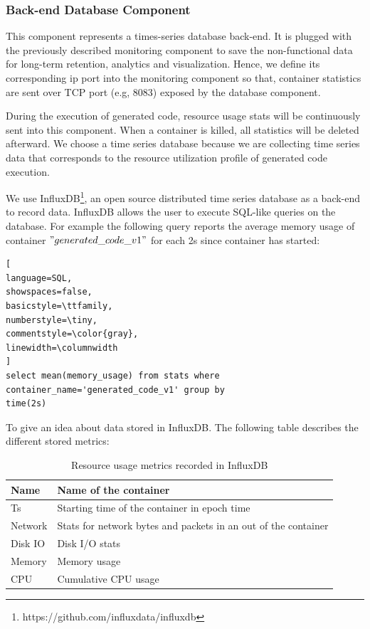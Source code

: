 \subsubsection{Back-end Database Component}
This component represents a times-series database back-end. It is plugged with the previously described monitoring component to save the non-functional data for long-term retention, analytics and visualization. Hence, we define its corresponding ip port into the monitoring component so that, container statistics are sent over TCP port (e.g, 8083) exposed by the database component.

During the execution of generated code, resource usage stats will be continuously sent into this component. When a container is killed, all statistics will be deleted afterward. We choose a time series database because we are collecting time series data that corresponds to the resource utilization profile of generated code execution.

We use InfluxDB\footnote{https://github.com/influxdata/influxdb}, an open source distributed time series database as a back-end to record data. InfluxDB allows the user to execute SQL-like queries on the database. For example the following query reports the average memory usage of container $"generated\_code\_v1"$ for each 2s since container has started:

\begin{lstlisting}[
language=SQL,
showspaces=false,
basicstyle=\ttfamily,
numberstyle=\tiny,
commentstyle=\color{gray},
linewidth=\columnwidth
]
select mean(memory_usage) from stats where 
container_name='generated_code_v1' group by 
time(2s)
\end{lstlisting}
To give an idea about data stored in InfluxDB. The following table describes the different stored metrics:
 \begin{table}[h]
 	\begin{center}
 		\begin{tabular}{|p{1cm}|p{6.9cm}|}
 			\hline
 			 Name & Name of the container \\
 			\hline
 			 Ts & Starting time of the container in epoch time \\
 			\hline
 			 Network &  Stats for network bytes and packets in an out of the container \\
 			\hline
 			 Disk IO &  Disk I/O stats \\
 			\hline
 			 Memory &  Memory usage \\
 			
 			\hline
 		   	CPU &  Cumulative CPU usage \\
 			\hline
 			
 		\end{tabular}
 		
 	\end{center}
 	\caption {Resource usage metrics recorded in InfluxDB}
 \end{table}

